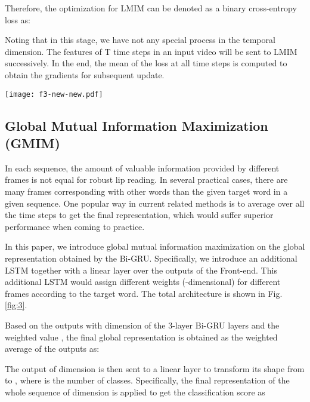 \documentclass[a4paper, 10pt, conference]{ieeeconf}      \usepackage{FG2020}
\begin{document}
Therefore, the optimization for LMIM can be denoted as a binary cross-entropy loss as:

\noindent Noting that in this stage, we have not any special process in the temporal dimension. The features of T time steps in an input video will be sent to LMIM successively. In the end, the mean of the loss at all time steps is computed to obtain the gradients for subsequent update.
   \begin{figure*}[t]
   
      \centering
      \texttt{[image: f3-new-new.pdf]}
       \caption{The process of training the network with the proposed GMIM, noted that when we apply the GMIM, a single layer LSTM and a linear layer are also added to the Back-end for computing the weight of each frame, it will be retained after training while the GMIM will be dropped.}
    \label{fig:3}
   \end{figure*}
\subsection{Global Mutual Information Maximization (GMIM)}\label{3.3}
In each sequence, the amount of valuable information provided by different frames is not equal for robust lip reading. In several practical cases, there are many frames corresponding with other words than the given target word in a given sequence. One popular way in current related methods is to average over all the time steps to get the final representation, which would suffer superior performance when coming to practice.

In this paper, we introduce global mutual information maximization on the global representation obtained by the Bi-GRU. Specifically, we introduce an additional LSTM together with a linear layer over the outputs of the Front-end. This additional LSTM would assign different weights  (-dimensional) for different frames according to the target word. The total architecture is shown in Fig. \ref{fig:3}.

Based on the outputs  with dimension  of the 3-layer Bi-GRU layers and the weighted value , the final global representation is obtained as the weighted average of the outputs  as:

\noindent The output  of dimension  is then sent to a linear layer to transform its shape from  to , where  is the number of classes. Specifically, the final representation of the whole sequence  of dimension  is applied to get the classification score as
\end{document}
